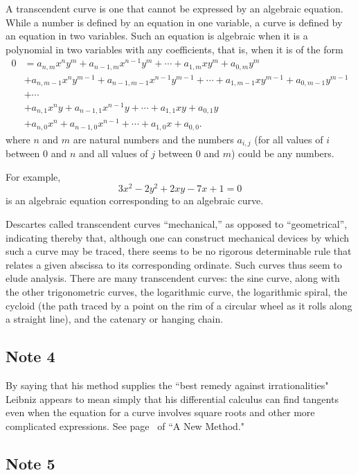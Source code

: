 \documentclass[polutonikogreek,english,twoside,openright]{article}
\begin{document}
A transcendent curve is one that cannot be expressed by an algebraic
equation.  While a number is defined by an equation in one variable, a
curve is defined by an equation in two variables.  Such an equation is
algebraic when it is a polynomial in two variables with any
coefficients, that is, when it is of the form
\begin{align*}
0 & = a_{n,m}x^ny^m + a_{n-1,m}x^{n-1}y^m + \cdots + a_{1,m}xy^{m} + a_{0,m}y^m\\
&+ a_{n,m-1}x^ny^{m-1} + a_{n-1,m-1}x^{n-1}y^{m-1} + \cdots + a_{1,m-1}xy^{m-1} + a_{0,m-1}y^{m-1} \\
& +\cdots \\
&+ a_{n,1}x^ny + a_{n-1,1}x^{n-1}y+ \cdots + a_{1,1}xy+ a_{0,1}y \\
& +a_{n,0}x^n + a_{n-1,0}x^{n-1}+ \cdots + a_{1,0}x+ a_{0,0}.
\end{align*}
where $n$ and $m$ are natural numbers and the numbers $a_{i,j}$ (for
all values of $i$ between 0 and $n$ and all values of $j$ between 0
and $m$) could be any numbers.

For example,
 $$3x^2 - 2y^2 + 2xy - 7x + 1 = 0$$
is an algebraic equation corresponding to an algebraic curve.  

Descartes called transcendent curves ``mechanical,'' as opposed to
``geometrical'', indicating thereby that, although one can construct
mechanical devices by which such a curve may be traced, there seems to
be no rigorous determinable rule that relates a given abscissa to its
corresponding ordinate. Such curves thus seem to elude analysis. There
are many transcendent curves: the sine curve, along with the other
trigonometric curves, the logarithmic curve, the logarithmic spiral,
the cycloid (the path traced by a point on the rim of a circular wheel
as it rolls along a straight line), and the catenary or hanging chain.

\subsection*{Note 4}
\label{crg4}

By saying that his method supplies the ``best remedy against
irrationalities" Leibniz appears to mean simply that his differential
calculus can find tangents even when the equation for a curve involves
square roots and other more complicated expressions.  See
page~\pageref{nmdiffeq} of ``A New Method."

\subsection*{Note 5}
\label{crg5}
\end{document}
